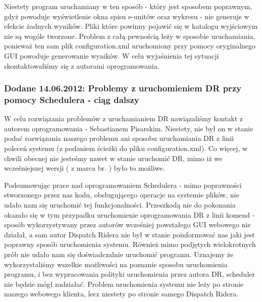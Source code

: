 Niestety program uruchamiany w ten sposób - który jest sposobem poprawnym, gdyż powoduje wyświetlenie okna spisu e-unitów oraz wykresu - nie generuje w efekcie żadnych wyników. Pliki które powinny pojawić się w katalogu wyjściowym nie są wogóle tworzone. Problem z całą pewnością leży w sposobie uruchamiania, ponieważ ten sam plik configuration.xml uruchomiony przy pomocy oryginalnego GUI powoduje generowanie wyników. W celu wyjaśnienia tej sytuacji skontaktowaliśmy się z autorami oprogramowania.

\subsubsection{Dodane 14.06.2012: Problemy z uruchomieniem DR przy pomocy Schedulera - ciąg dalszy}

W celu rozwiązania problemów z uruchamianiem DR nawiązaliśmy kontakt z autorem oprogramowania - Sebastianem Pisarskim. Niestety, nie był on w stanie podać rozwiązania naszego problemu ani sposobu uruchamiania DR z linii poleceń systemu (z podaniem ścieżki do pliku configuration.xml). Co więcej, w chwili obecnej nie jesteśmy nawet w stanie uruchomić DR, mimo iż we wcześniejszej wersji ( z marca br. ) było to możliwe.

Podsumowując prace nad oprogramowaniem Schedulera - mimo poprawności stworzonego przez nas kodu, obsługującego operacje na systemie plików, nie udało nam się uruchomić tej funkcjonalności. Przeszkodą nie do pokonania okazało się w tym przypadku uruchomienie oprogramowania DR z linii komend - sposób wykorzystywany przez autorów wcześniej powstałego GUI webowego nie działał, a sam autor Dispatch Ridera nie był w stanie poinformować nas jaki jest poprawny sposób uruchomienia systemu. Również mimo podjętych wielokrotnych prób nie udało nam się doświadczalnie uruchomić programu. Uznajemy że wykorzystaliśmy wszelkie możliwości na poznanie sposobu uruchomienia programu, i bez wypracowania polityki uruchomienia przez autora DR, scheduler nie będzie mógł zadziałać. Problem uruchomienia systemu nie leży po stronie naszego webowego klienta, lecz niestety po stronie samego Dispatch Ridera.